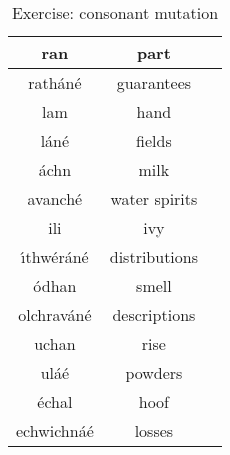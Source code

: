 \begin{table}[H]
{\begin{tabu}{|c|c|p{10.0cm}|}
  \midrule
  ran & part & \\
  \midrule
  rath\'{a}n\'{e} & guarantees & \\
  \midrule
  lam & hand & \\
  \midrule
  l\'{a}n\'{e} & fields & \\
  \midrule
  \'{a}chn & milk & \\
  \midrule
  avanch\'{e} & water spirits & \\
  \midrule
  ili & ivy & \\
  \midrule
  \'{\i}thw\'{e}r\'{a}n\'{e} & distributions & \\
  \midrule
  \'{o}dhan & smell & \\
  \midrule
  olchrav\'{a}n\'{e} & descriptions & \\
  \midrule
  uchan & rise & \\
  \midrule
  ul\'{a}\'{e} & powders & \\
  \midrule
  \'{e}chal & hoof & \\
  \midrule
  echwichn\'{a}\'{e} & losses & \\
  \bottomrule
\end{tabu}
}
\label{exercise_consonant_mutation}
\caption{Exercise: consonant mutation}
\end{table}

